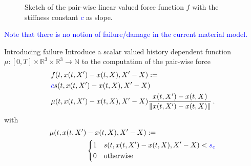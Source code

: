 \documentclass[12pt,t]{beamer}
\newcommand{\args}{(t,x(t,X')-x(t,X),X'-X)}
\begin{document}
\begin{frame}{}
\begin{figure}[H]
\caption[Sketch of the pair-wise linear valued force function $f$ with the stiffness constant $c$ as slope.]{Sketch of the pair-wise linear valued force function $f$ with the stiffness constant \textcolor{blue}{$c$} as slope.}
\label{fig::force::sketch}
\end{figure}
\begin{center}
\textcolor{blue}{Note that there is no notion of failure/damage in the current material model.}
\end{center}
\end{frame}

\begin{frame}{Introducing failure}
Introduce a scalar valued history dependent function $\mu:[0,T]\times\mathbb{R}^3\times\mathbb{R}^3\rightarrow\mathbb{N}$ to the computation of the pair-wise force
\begin{align*}
&f(t,x(t,X')-x(t,X),X'-X):= \notag\\ & \textcolor{blue}{c} s(t,x(t,X')-x(t,X),X'-X) \\&\mu\args \frac{x(t,X')-x(t,X)}{\Vert x(t,X')-x(t,X)\Vert}\,\text{.} 
\end{align*}
with
\begin{align}
\mu(t,x(t,X')&-x(t,X),X'-X):= \\&
 \left\{
 \begin{aligned}
 & 1 \quad s(t,x(t,X')-x(t,X),X'-X) < \textcolor{blue}{s_{c}} \\
 & 0 \quad \text{otherwise}
\end{aligned}
 \right.
\end{align}
\end{frame}
\end{document}
